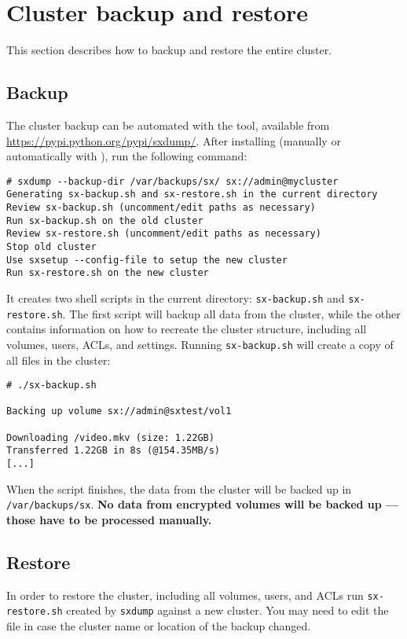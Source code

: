 \section{Cluster backup and restore}
This section describes how to backup and restore the entire cluster.

\subsection{Backup}
The cluster backup can be automated with the  tool, available
from \url{https://pypi.python.org/pypi/sxdump/}. After installing 
(manually or automatically with ), run the following command:
\begin{lstlisting}
# sxdump --backup-dir /var/backups/sx/ sx://admin@mycluster
Generating sx-backup.sh and sx-restore.sh in the current directory
Review sx-backup.sh (uncomment/edit paths as necessary)
Run sx-backup.sh on the old cluster
Review sx-restore.sh (uncomment/edit paths as necessary)
Stop old cluster
Use sxsetup --config-file to setup the new cluster
Run sx-restore.sh on the new cluster
\end{lstlisting}
It creates two shell scripts in the current directory: \verb+sx-backup.sh+ and
\verb+sx-restore.sh+. The first script will backup all data from the cluster,
while the other contains information on how to recreate the cluster structure,
including all volumes, users, ACLs, and settings. Running
\verb+sx-backup.sh+ will create a copy of all files in the cluster:
\begin{lstlisting}
# ./sx-backup.sh

Backing up volume sx://admin@sxtest/vol1

Downloading /video.mkv (size: 1.22GB)
Transferred 1.22GB in 8s (@154.35MB/s)           
[...]
\end{lstlisting}
When the script finishes, the data from the cluster will be backed up
in \verb+/var/backups/sx+. \textbf{No data from encrypted volumes will be
backed up --- those have to be processed manually.}

\subsection{Restore}
In order to restore the cluster, including all volumes, users, and ACLs run
\verb+sx-restore.sh+ created by \verb+sxdump+ against a new cluster. You may
need to edit the file in case the cluster name or location of the backup changed.

